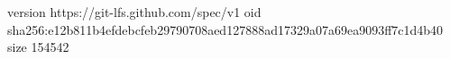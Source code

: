 version https://git-lfs.github.com/spec/v1
oid sha256:e12b811b4efdebcfeb29790708aed127888ad17329a07a69ea9093ff7c1d4b40
size 154542
